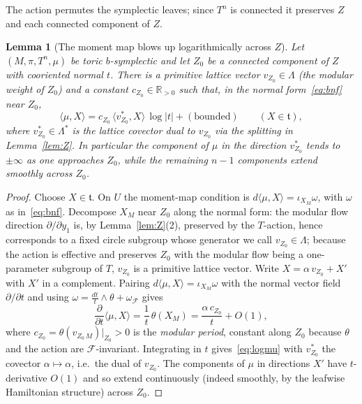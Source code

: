 \documentclass{amsart}
\newtheorem{lemma}{Lemma}
\theoremstyle{definition}
\begin{document}
The action permutes the symplectic leaves; since $T^n$ is connected it
preserves $Z$ and each connected component of $Z$.

\begin{lemma}[The moment map blows up logarithmically across $Z$]\label{lem:blowup}
Let $(M,\pi,T^n,\mu)$ be toric $b$-symplectic and let $Z_0$ be a connected
component of $Z$ with cooriented normal $t$. There is a primitive lattice
vector $v_{Z_0}\in\Lambda$ (the \emph{modular weight} of $Z_0$) and a constant
$c_{Z_0}\in\mathbb R_{>0}$ such that, in the normal form~\eqref{eq:bnf} near
$Z_0$,
\begin{equation}\label{eq:logmu}
\langle\mu,X\rangle=c_{Z_0}\,\langle v^*_{Z_0},X\rangle\,\log|t|+(\text{bounded})
\qquad(X\in\mathfrak t),
\end{equation}
where $v^*_{Z_0}\in\Lambda^*$ is the lattice covector dual to $v_{Z_0}$ via the
splitting in Lemma~\ref{lem:Z}. In particular the component of $\mu$ in the
direction $v^*_{Z_0}$ tends to $\pm\infty$ as one approaches $Z_0$, while the
remaining $n-1$ components extend smoothly across $Z_0$.
\end{lemma}

\begin{proof}
Choose $X\in\mathfrak t$. On $U$ the moment-map condition is
$d\langle\mu,X\rangle=\iota_{X_M}\omega$, with $\omega$ as
in~\eqref{eq:bnf}. Decompose $X_M$ near $Z_0$ along the normal form: the
modular flow direction $\partial/\partial y_1$ is, by Lemma~\ref{lem:Z}(2),
preserved by the $T$-action, hence corresponds to a fixed circle subgroup whose
generator we call $v_{Z_0}\in\Lambda$; because the action is effective and
preserves $Z_0$ with the modular flow being a one-parameter subgroup of $T$,
$v_{Z_0}$ is a primitive lattice vector. Write $X=\alpha\, v_{Z_0}+X'$ with
$X'$ in a complement. Pairing $d\langle\mu,X\rangle=\iota_{X_M}\omega$ with the
normal vector field $\partial/\partial t$ and using
$\omega=\frac{dt}{t}\wedge\theta+\omega_{\mathcal F}$ gives
\[
\frac{\partial}{\partial t}\langle\mu,X\rangle
=\frac{1}{t}\,\theta(X_M)=\frac{\alpha\, c_{Z_0}}{t}+O(1),
\]
where $c_{Z_0}=\theta(v_{Z_0\,M})|_{Z_0}>0$ is the \emph{modular period},
constant along $Z_0$ because $\theta$ and the action are $\mathcal
F$-invariant. Integrating in $t$ gives~\eqref{eq:logmu} with $v^*_{Z_0}$ the
covector $\alpha\mapsto\alpha$, i.e.\ the dual of $v_{Z_0}$. The components of
$\mu$ in directions $X'$ have $t$-derivative $O(1)$ and so extend continuously
(indeed smoothly, by the leafwise Hamiltonian structure) across $Z_0$.
\end{proof}
\end{document}
